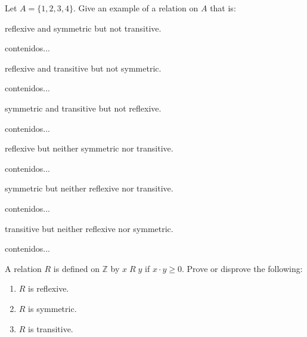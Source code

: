\documentclass[12pt]{article}
\newcommand{\Z}{\mathbb{Z}}
\newenvironment{problem}[2][Problem]{\begin{trivlist}
		\item[\hskip \labelsep {\bfseries #1}\hskip \labelsep {\bfseries #2.}]}{\end{trivlist}}
\newenvironment{solution}[2][Solution]{\begin{trivlist}
		\item[\hskip \labelsep {\bfseries #1}\hskip \labelsep {\bfseries #2.}]}{\end{trivlist}}
\begin{document}
 	\begin{problem}{18}
 		Let $A=\{1,2,3,4\}$. Give an example of a relation on $A$ that is:
 		\begin{enumerate}[label=(\alph*)]
 			\item reflexive and symmetric but not transitive.
 			\begin{solution}{(a)}
 				contenidos...
 			\end{solution}
 			\item reflexive and transitive but not symmetric.
 			\begin{solution}{(b)}
 				contenidos...
 			\end{solution}
 			\item symmetric and transitive but not reflexive.
 			\begin{solution}{(c)}
 				contenidos...
 			\end{solution}
 			\item reflexive but neither symmetric nor transitive.
 			\begin{solution}{(d)}
 				contenidos...
 			\end{solution}
 			\item symmetric but neither reflexive nor transitive.
 			\begin{solution}{(e)}
 				contenidos...
 			\end{solution}
 			\item transitive but neither reflexive nor symmetric.
 			\begin{solution}{(f)}
 				contenidos...
 			\end{solution}
 		\end{enumerate}
 	\end{problem}
 
 	\begin{problem}{19}
 		A relation $R$ is defined on $\Z$ by $x\; R \; y$ if $x\cdot y \geq 0$. Prove or disprove the following:
 		\begin{enumerate}[label=(\alph*)]
 			\item $R$ is reflexive.
 			\item $R$ is symmetric.
 			\item $R$ is transitive.
 		\end{enumerate}
 	\end{problem}
 
\end{document}
